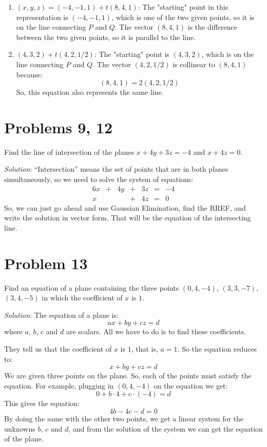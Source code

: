\documentclass[12pt]{article}
\begin{document}
\begin{enumerate}
\item $(x,y,z)=(-4,-1,1)+t(8,4,1)$: The "starting" point in this representation is $(-4,-1,1)$, which is one of the two given points, so it is on the line connecting $P$ and $Q$. The vector $(8,4,1)$ is the difference between the two given points, so it is parallel to the line.
\item $(4,3,2)+t(4, 2, 1/2)$: The "starting" point is $(4,3,2)$, which is on the line connecting $P$ and $Q$. The vector $(4,2,1/2)$ is collinear to $(8,4,1)$ because:
\[
(8,4,1)=2(4,2,1/2)
\]
So, this equation also represents the same line.
\end{enumerate}

\section{Problems 9, 12} Find the line of intersection of the planes $x+4y+3z=-4$ and $x+4z=0$.

\emph{Solution}: ``Intersection'' means the set of points that are in both planes simultaneously, so we need to solve the system of equations:
\begin{alignat*}{6}
x &{}+{}& 4y &{}+{}& 3z &{}={}& -4\\
x &{}{}&     &{}+{}& 4z &{}={}& 0
\end{alignat*}
So, we can just go ahead and use Gaussian Elimination, find the RREF, and write the solution in vector form. That will be the equation of the intersecting line.

\section{Problem 13}
Find an equation of a plane containing the three points $(0, 4, -4)$, $(3, 3, -7)$, $(3, 4, -5)$ in which the coefficient of $x$ is $1$.

\emph{Solution}: The equation of a plane is:
\[
ax+by+cz=d
\]
where $a$, $b$, $c$ and $d$ are scalars. All we have to do is to find these coefficients.

They tell us that the coefficient of $x$ is $1$, that is, $a=1$. So the equation reduces to:
\[
x+by+cz=d
\]
We are given three points on the plane. So, each of the points must satisfy the equation. For example, plugging in $(0,4,-4)$ on the equation we get:
\[
0+b\cdot4+c\cdot(-4)=d
\]
This gives the equation:
\[
4b-4c-d=0
\]
By doing the same with the other two points, we get a linear system for the unknowns $b$, $c$ and $d$, and from the solution of the system we can get the equation of the plane.
\end{document}
